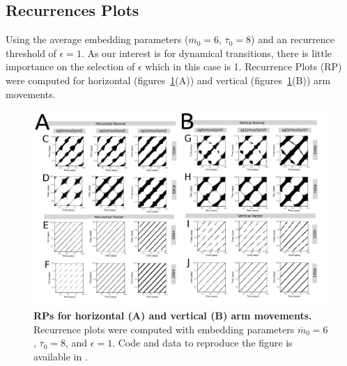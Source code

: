 \documentclass[fleqn,10pt]{wlscirep}
\begin{document}
\subsection*{Recurrences Plots}
Using the average embedding parameters 
($\overline{m}_0=6$, $\overline{\tau}_0=8$) 
and an recurrence threshold of $\epsilon=1$.
As our interest is for dynamical transitions, 
there is little importance on the selection of $\epsilon$ which in this case
is 1. 
Recurrence Plots (RP) were computed for horizontal (figures~\ref{fig:rpsr}(A)) and 
vertical (figures~\ref{fig:rpsr}(B)) arm movements.
\begin{figure}[ht]
\centering
\includegraphics[width=1.0\textwidth]{fig-fig4.pdf}
\caption{
	{\bf RPs for horizontal (A) and vertical (B) arm movements.}	
	Recurrence plots were computed with 
	embedding parameters 
	$\overline{m}_0=6$, $\overline{\tau}_0=8$, and $\epsilon=1$.
	Code and data to reproduce the figure is available in \cite{srep2020}.
        }
    \label{fig:rpsr}
\end{figure}
\end{document}
